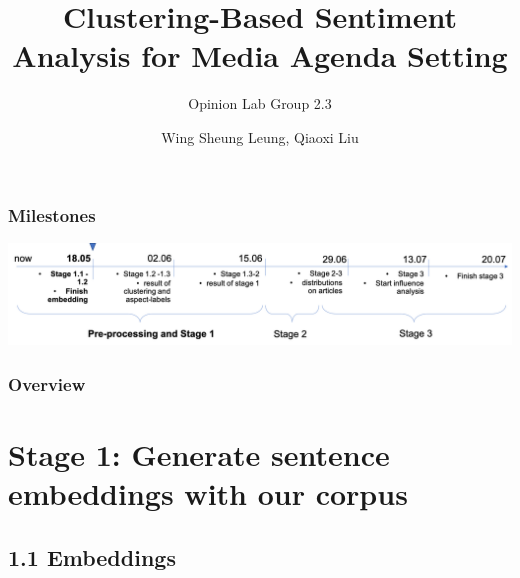 \documentclass{tum-presentation}
\title[Shortened Title]{Clustering-Based Sentiment Analysis for Media Agenda Setting}
\subtitle{Opinion Lab Group 2.3}
\author{Wing Sheung Leung, Qiaoxi Liu}
\begin{document}
\begin{frame}[noframenumbering]
  \titlepage
\end{frame}
\begin{frame}
  \frametitle{Milestones}
  \vspace{2cm}
 \includegraphics[width = \textwidth]{figures/timeline.png}
  
\end{frame}
\begin{frame}[t]
  \frametitle{Overview}
  \tableofcontents[sectionstyle=show,subsectionstyle=show,subsubsectionstyle=shaded]
\end{frame}



\section{Stage 1: Generate sentence embeddings with our corpus}
\subsection{1.1 Embeddings}
\end{document}
